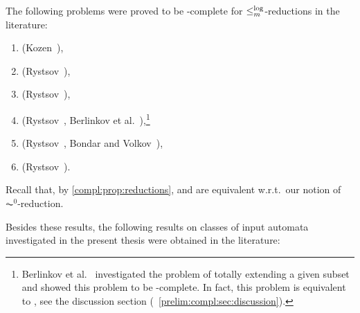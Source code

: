 
The following problems were proved to be \PSPACE-complete
for  $\le_m^{\log}$-reductions in the literature:
\begin{enumerate}
	\item \DFAINT (Kozen~\cite{Kozen77}), 
	
	\item \ST (Rystsov~\cite{Rys83}),
	
	\item \label{prelim:thm:complexities:SFS}	\SFS (Rystsov~\cite{Rys83}),		
	
	\item \label{prelim:thm:complexities:SIS} \SIS (Rystsov~\cite{Rys83}, Berlinkov et al.~\cite{BerlinkovFS21}),\footnote{Berlinkov et al.~\cite{BerlinkovFS21} 
		investigated the problem of totally extending a given subset and showed this problem to be \PSPACE-complete.
		In fact, this problem is equivalent to \SIS, see the discussion section (\SEC~\ref{prelim:compl:sec:discussion}).}
	
	\item \REACH (Rystsov~\cite{Rys83}, Bondar and Volkov~\cite{BondarV16}), \label{reach-pspace}
	
	\item \REACHF (Rystsov~\cite{Rys83}).
\end{enumerate}

Recall that, by \cref{compl:prop:reductions}, \DFAINT and \ST are equivalent
w.r.t.~our notion of $\AC^0$-reduction.

Besides these results, the following
results on classes of input automata investigated in the present thesis were obtained in the literature: 

